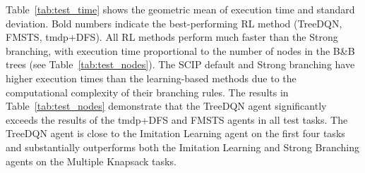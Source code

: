 \documentclass[preprint,12pt]{elsarticle} %
\theoremstyle{plain}
\theoremstyle{definition}
\theoremstyle{remark}
\begin{document}
\begin{table}[t]
\caption{Geometric mean of tree size with geometric std for test tasks.}\label{tab:test_nodes}
\begin{center}
\end{center}
\end{table}





Table~\ref{tab:test_time} shows the geometric mean of execution time and standard deviation. Bold numbers indicate the best-performing RL method (TreeDQN, FMSTS, tmdp+DFS). All RL methods perform much faster than the Strong branching, with execution time proportional to the number of nodes in the B\&B trees (see Table~\ref{tab:test_nodes}). The SCIP default and Strong branching have higher execution times than the learning-based methods due to the computational complexity of their branching rules. The results in Table~\ref{tab:test_nodes} demonstrate that the TreeDQN agent significantly exceeds the results of the tmdp+DFS and FMSTS agents in all test tasks. The TreeDQN agent is close to the Imitation Learning agent on the first four tasks and substantially outperforms both the Imitation Learning and Strong Branching agents on the Multiple Knapsack tasks.
\end{document}
